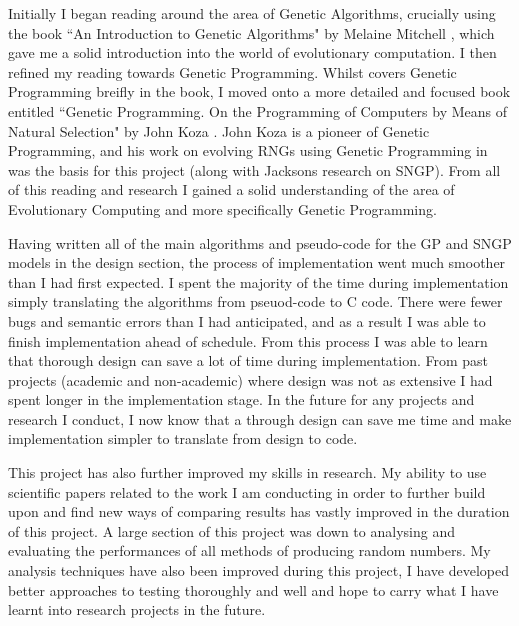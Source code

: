 \documentclass[a4paper,10.5pt]{article}
\begin{document}
Initially I began reading around the area of Genetic Algorithms, crucially using the book ``An Introduction to Genetic Algorithms" by Melaine Mitchell \cite{mitchell}, which gave me a solid introduction into the world of evolutionary computation. I then refined my reading towards Genetic Programming. Whilst \cite{mitchell} covers Genetic Programming breifly in the book, I moved onto a more detailed and focused book entitled ``Genetic Programming. On the Programming of Computers by Means of Natural Selection" by John Koza \cite{kozagpbook}. John Koza is a pioneer of Genetic Programming, and his work on evolving RNGs using Genetic Programming in \cite{kozarng} was the basis for this project (along with Jacksons research on SNGP). From all of this reading and research I gained a solid understanding of the area of Evolutionary Computing and more specifically Genetic Programming.

Having written all of the main algorithms and pseudo-code for the GP and SNGP models in the design section, the process of implementation went much smoother than I had first expected. I spent the majority of the time during implementation simply translating the algorithms from pseuod-code to C code. There were fewer bugs and semantic errors than I had anticipated, and as a result I was able to finish implementation ahead of schedule. From this process I was able to learn that thorough design can save a lot of time during implementation. From past projects (academic and non-academic) where design was not as extensive I had spent longer in the implementation stage. In the future for any projects and research I conduct, I now know that a through design can save me time and make implementation simpler to translate from design to code.

This project has also further improved my skills in research. My ability to use scientific papers related to the work I am conducting in order to further build upon and find new ways of comparing results has vastly improved in the duration of this project. A large section of this project was down to analysing and evaluating the performances of all methods of producing random numbers. My analysis techniques have also been improved during this project, I have developed better approaches to testing thoroughly and well and hope to carry what I have learnt into research projects in the future. 
\end{document}
